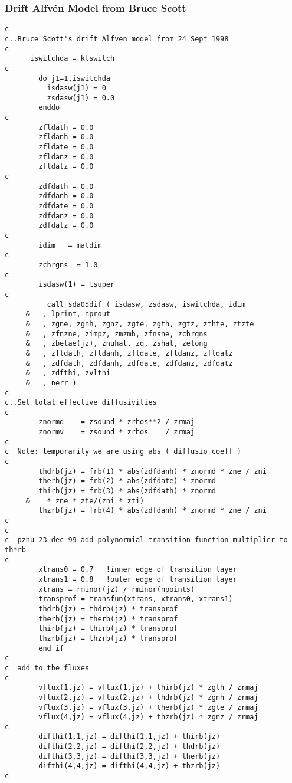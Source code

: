 \subsubsection{Drift Alfv\'en Model from Bruce Scott}
\begin{verbatim}
c
c..Bruce Scott's drift Alfven model from 24 Sept 1998
c
      iswitchda = klswitch
c
        do j1=1,iswitchda
          isdasw(j1) = 0
          zsdasw(j1) = 0.0
        enddo
c
        zfldath = 0.0
        zfldanh = 0.0
        zfldate = 0.0
        zfldanz = 0.0
        zfldatz = 0.0
c
        zdfdath = 0.0
        zdfdanh = 0.0
        zdfdate = 0.0
        zdfdanz = 0.0
        zdfdatz = 0.0
c
        idim   = matdim
c
        zchrgns  = 1.0
c
        isdasw(1) = lsuper
c
          call sda05dif ( isdasw, zsdasw, iswitchda, idim
     &   , lprint, nprout
     &   , zgne, zgnh, zgnz, zgte, zgth, zgtz, zthte, ztzte
     &   , zfnzne, zimpz, zmzmh, zfnsne, zchrgns
     &   , zbetae(jz), znuhat, zq, zshat, zelong
     &   , zfldath, zfldanh, zfldate, zfldanz, zfldatz
     &   , zdfdath, zdfdanh, zdfdate, zdfdanz, zdfdatz
     &   , zdfthi, zvlthi
     &   , nerr )
c
c..Set total effective diffusivities
c
        znormd    = zsound * zrhos**2 / zrmaj
        znormv    = zsound * zrhos    / zrmaj
c
c  Note: temporarily we are using abs ( diffusio coeff )
c
        thdrb(jz) = frb(1) * abs(zdfdanh) * znormd * zne / zni
        therb(jz) = frb(2) * abs(zdfdate) * znormd
        thirb(jz) = frb(3) * abs(zdfdath) * znormd
     &    * zne * zte/(zni * zti)
        thzrb(jz) = frb(4) * abs(zdfdanh) * znormd * zne / zni
c
c
c  pzhu 23-dec-99 add polynormial transition function multiplier to th*rb  
c
        xtrans0 = 0.7	!inner edge of transition layer
        xtrans1 = 0.8	!outer edge of transition layer
        xtrans = rminor(jz) / rminor(npoints)
        transprof = transfun(xtrans, xtrans0, xtrans1)
        thdrb(jz) = thdrb(jz) * transprof
        therb(jz) = therb(jz) * transprof
        thirb(jz) = thirb(jz) * transprof
        thzrb(jz) = thzrb(jz) * transprof
        end if
c
c  add to the fluxes
c
        vflux(1,jz) = vflux(1,jz) + thirb(jz) * zgth / zrmaj
        vflux(2,jz) = vflux(2,jz) + thdrb(jz) * zgnh / zrmaj
        vflux(3,jz) = vflux(3,jz) + therb(jz) * zgte / zrmaj
        vflux(4,jz) = vflux(4,jz) + thzrb(jz) * zgnz / zrmaj
c
        difthi(1,1,jz) = difthi(1,1,jz) + thirb(jz)
        difthi(2,2,jz) = difthi(2,2,jz) + thdrb(jz)
        difthi(3,3,jz) = difthi(3,3,jz) + therb(jz)
        difthi(4,4,jz) = difthi(4,4,jz) + thzrb(jz)
c
\end{verbatim}

